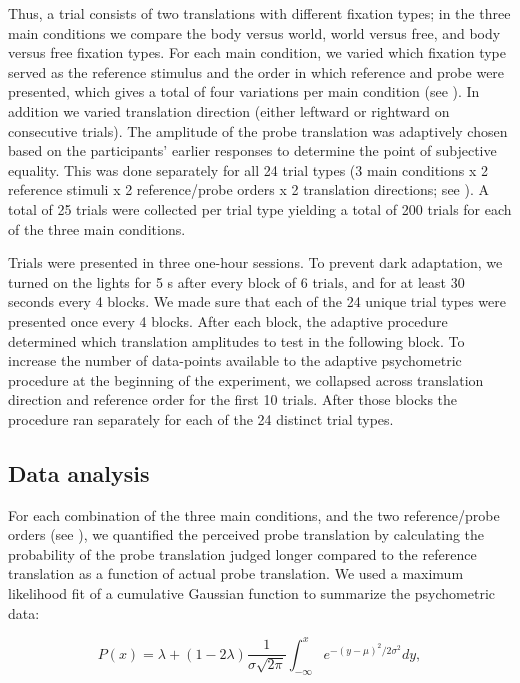 Thus, a trial consists of two translations with different fixation types; in the three main conditions we compare the body versus world, world versus free, and body versus free fixation types. For each main condition, we varied which fixation type served as the reference stimulus and the order in which reference and probe were presented, which gives a total of four variations per main condition (see ). In addition we varied translation direction (either leftward or rightward on consecutive trials). The amplitude of the probe translation was adaptively chosen based on the participants' earlier responses \cite{kontsevich1999} to determine the point of subjective equality. This was done separately for all 24 trial types (3 main conditions x 2 reference stimuli x 2 reference/probe orders x 2 translation directions; see ). A total of 25 trials were collected per trial type yielding a total of 200 trials for each of the three main conditions.

Trials were presented in three one-hour sessions. To prevent dark adaptation, we turned on the lights for 5 \si{\second} after every block of 6 trials, and for at least 30 seconds every 4 blocks. We made sure that each of the 24 unique trial types were presented once every 4 blocks. After each block, the adaptive procedure determined which translation amplitudes to test in the following block. To increase the number of data-points available to the adaptive psychometric procedure at the beginning of the experiment, we collapsed across translation direction and reference order for the first 10 trials. After those blocks the procedure ran separately for each of the 24 distinct trial types.

\subsection{Data analysis}

For each combination of the three main conditions, and the two reference/probe orders (see ), we quantified the perceived probe translation by calculating the probability of the probe translation judged longer compared to the reference translation as a function of actual probe translation. We used a maximum likelihood fit of a cumulative Gaussian function to summarize the psychometric data:

\begin{equation}
\label{p3:eq1}
P(x) = \lambda + (1 - 2\lambda) \frac{1}{\sigma \sqrt{2\pi}} \int_{-\infty}^{x}{e^{-(y-\mu)^2 / 2\sigma^2}}dy,
\end{equation}

